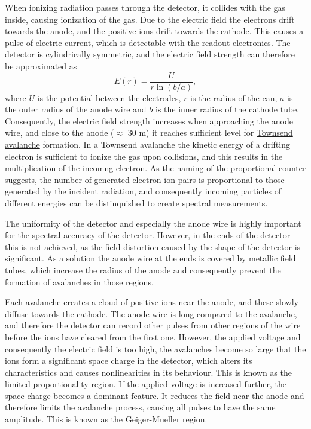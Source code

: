 \documentclass[a4paper]{article}
\begin{document}
When ionizing radiation passes through the detector, it collides with the gas inside, causing ionization of the gas.
Due to the electric field the electrons drift towards the anode, and the positive ions drift towards the cathode.
This causes a pulse of electric current, which is detectable with the readout electronics.
The detector is cylindrically symmetric, and the electric field strength can therefore be approximated as
\begin{equation}
E(r) = \frac{U}{r \ln(b/a) },
\end{equation}
where $U$ is the potential between the electrodes, $r$ is the radius of the can, $a$ is the outer radius of the anode wire and $b$ is the inner radius of the cathode tube.
Consequently, the electric field strength increases when approaching the anode wire, and close to the anode ($\approx$ 30 \textmu m) it reaches sufficient level for
\href{https://en.wikipedia.org/wiki/Townsend_discharge}{Townsend avalanche} formation.
In a Townsend avalanche the kinetic energy of a drifting electron is sufficient to ionize the gas upon collisions, and this results in the multiplication of the incomng electron.
As the naming of the proportional counter suggests, the number of generated electron-ion pairs is proportional to those generated by the incident radiation, and consequently incoming particles of different energies can be distinquished to create spectral measurements.
\cites{winkler_gaseous_2015}[p. 159--164]{knoll_radiation_2010}

The uniformity of the detector and especially the anode wire is highly important for the spectral accuracy of the detector.
However, in the ends of the detector this is not achieved, as the field distortion caused by the shape of the detector is significant.
As a solution the anode wire at the ends is covered by metallic field tubes, which increase the radius of the anode and consequently prevent the formation of avalanches in those regions.
\cite[p. 165]{knoll_radiation_2010}

Each avalanche creates a cloud of positive ions near the anode, and these slowly diffuse towards the cathode.
The anode wire is long compared to the avalanche, and therefore the detector can record other pulses from other regions of the wire before the ions have cleared from the first one.
However, the applied voltage and consequently the electric field is too high, the avalanches become so large that the ions form a significant space charge in the detector, which alters its characteristics and causes nonlinearities in its behaviour.
This is known as the limited proportionality region.
If the applied voltage is increased further, the space charge becomes a dominant feature.
It reduces the field near the anode and therefore limits the avalanche process, causing all pulses to have the same amplitude.
This is known as the Geiger-Mueller region.
\cite[p. 160--161]{knoll_radiation_2010}
\end{document}
